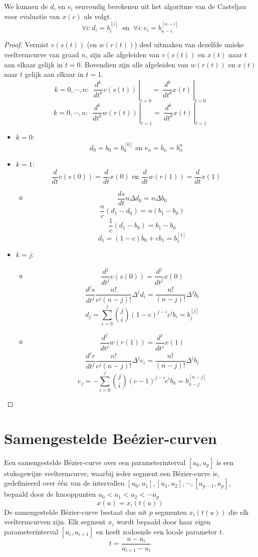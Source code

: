 \documentclass[computergesteund_ontwerp_van_curven_en_oppervlakken.tex]{subfiles}
\begin{document}
\begin{st}
We kunnen de $d_i$ en $e_i$ eenvoudig berekenen uit het algoritme van de Casteljau voor evaluatie van $x(c)$ als volgt.
\[
\forall i: d_i = b_{i}^{[i]}\ \text{ en }\ \forall i: e_i = b_{n-i}^{[n-i]}
\]
\begin{proof}
Vermist $v(s(t))$ (en $w(r(t))$) deel uitmaken van dezelfde unieke veeltermcurve van graad $n$, zijn alle afgeleiden van $v(s(t))$ en $x(t)$ naar $t$ aan elkaar gelijk in $t=0$. Bovendien zijn alle afgeleiden van $w(r(t))$ en $x(t)$ naar $t$ gelijk aan elkaar in $t=1$.
\[
k = 0,\cdots,n:\
\left.\ \frac{d^{k}}{dt^{k}}v(s(t))\ \right|_{t=0} = \left.\  \frac{d^{k}}{dt^{k}}x(t)\ \right|_{t=0} 
\] 
\[
k = 0,\cdots,n:\
\left.\ \frac{d^{k}}{dt^{k}}w(r(t))\ \right|_{t=1} = \left.\  \frac{d^{k}}{dt^{k}}x(t)\ \right|_{t=1} 
\] 

\begin{itemize}
\item $k=0$:
\[
d_0 = b_0 =b_0^{[0]} \text{ en } e_n = b_n = b_{n}^{n}
\]

\item $k=1$:
\[
\frac{d}{dt}v(s(0)) = \frac{d}{dt}x(0) \text{ en } \frac{d}{dt}w(r(1)) = \frac{d}{dt}x(1)
\]
\begin{itemize}
\item
\[
\frac{ds}{dt}n\Delta d_0 = n\Delta b_0
\]
\[
\frac{n}{c}(d_1-d_0) = n(b_1-b_0)
\]
\[
\frac{1}{c}(d_1-b_0) = b_1-b_0
\]
\[
d_1 = (1-c)b_0+cb_1 = b_1^{[1]}
\]

\end{itemize}

\item $k=j$:
\begin{itemize}
\item
\[
\frac{d^{j}}{dt^{j}}v(s(0)) = \frac{d^{j}}{dt^{j}}x(0)
\]
\[
\frac{d^{j}s}{dt^{j}}\frac{n!}{c^j(n-j)!}\Delta^{j}d_i
= \frac{n!}{(n-j)!}\Delta^{j}b_i
\]
\[
d_{j} = \sum_{i=0}^j{j \choose i}(1-c)^{j-i}c^ib_i= b_j^{[j]}
\]

\item
\[
\frac{d^{j}}{dt^{j}}w(r(1)) = \frac{d^{j}}{dt^{j}}x(1)
\]
\[
\frac{d^{j}r}{dt^{j}}\frac{n!}{c^j(n-j)!}\Delta^{j}e_i
= \frac{n!}{(n-j)!}\Delta^{j}b_i
\]
\[
e_{j} = -\sum_{i=0}^j{j \choose i}(c-1)^{j-i}c^ib_k= b_{n-j}^{[n-j]}
\]
\end{itemize}
\end{itemize}
\end{proof}
\end{st}
\section{Samengestelde Be\'ezier-curven}
Een samengestelde B\'ezier-curve over een parameterinterval $[u_0,u_p]$ is een stuksgewijze veeltermcurve, waarbij ieder segment een B\'ezier-curve is, gedefinieerd over \'e\'en van de intervallen $[u_0,u_1],[u_1,u_2],\cdots,[u_{p-1},u_{p}]$, bepaald door de knooppunten $u_0<u_1<u_2<\cdots u_p$
\[
x(u) = x_i(t(u))
\]
De samengestelde B\'ezier-curve bestaat dus uit $p$ segmenten $x_i(t(u))$ die elk veeltermcurven zijn. Elk segment $x_i$ wordt bepaald door haar eigen parameterinterval $[u_i,u_{i+1}]$ en heeft zodoende een locale parameter $t$.
\[
t = \frac{u-u_i}{u_{i+1}-u_i}
\]
\end{document}
